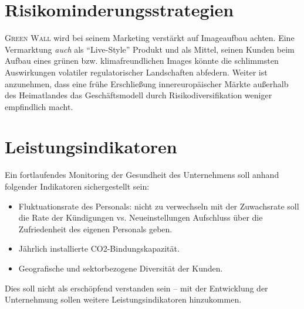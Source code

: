 \section{Risikominderungsstrategien}

\textsc{Green Wall} wird bei seinem Marketing verstärkt auf Imageaufbau achten.
Eine Vermarktung \textit{auch} als ``Live-Style'' Produkt und als Mittel, seinen Kunden beim Aufbau eines grünen bzw. klimafreundlichen Images könnte die schlimmsten Auswirkungen volatiler regulatorischer Landschaften abfedern.
Weiter ist anzunehmen, dass eine frühe Erschließung innereuropäischer Märkte außerhalb des Heimatlandes das Geschäftsmodell durch Risikodiversifikation weniger empfindlich macht.

\section{Leistungsindikatoren}

Ein fortlaufendes Monitoring der Gesundheit des Unternehmens soll anhand folgender Indikatoren sichergestellt sein:

\begin{itemize}
    \item Fluktuationsrate des Personals: nicht zu verwechseln mit der Zuwachsrate soll die Rate der Kündigungen vs. Neueinstellungen Aufschluss über die Zufriedenheit des eigenen Personals geben.
    \item Jährlich installierte CO2-Bindungskapazität.
    \item Geografische und sektorbezogene Diversität der Kunden.
\end{itemize}

Dies soll nicht als erschöpfend verstanden sein -- mit der Entwicklung der Unternehmung sollen weitere Leistungsindikatoren hinzukommen.
